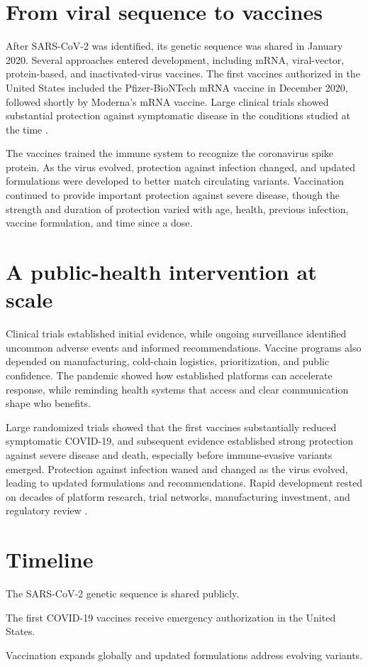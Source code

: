 \documentclass[12pt,oneside]{book}
\begin{document}
\section{From viral sequence to vaccines}
After SARS-CoV-2 was identified, its genetic sequence was shared in January
2020. Several approaches entered development, including mRNA, viral-vector,
protein-based, and inactivated-virus vaccines. The first vaccines authorized
in the United States included the Pfizer-BioNTech mRNA vaccine in December
2020, followed shortly by Moderna's mRNA vaccine. Large clinical trials
showed substantial protection against symptomatic disease in the conditions
studied at the time \cite{cdcCovidVaccineTimeline,cdcModernaTrial}.

The vaccines trained the immune system to recognize the coronavirus spike
protein. As the virus evolved, protection against infection changed, and
updated formulations were developed to better match circulating variants.
Vaccination continued to provide important protection against severe disease,
though the strength and duration of protection varied with age, health,
previous infection, vaccine formulation, and time since a dose.

\section{A public-health intervention at scale}
Clinical trials established initial evidence, while ongoing surveillance
identified uncommon adverse events and informed recommendations. Vaccine
programs also depended on manufacturing, cold-chain logistics, prioritization,
and public confidence. The pandemic showed how established platforms can
accelerate response, while reminding health systems that access and clear
communication shape who benefits.

Large randomized trials showed that the first vaccines substantially reduced
symptomatic COVID-19, and subsequent evidence established strong protection
against severe disease and death, especially before immune-evasive variants
emerged. Protection against infection waned and changed as the virus evolved,
leading to updated formulations and recommendations. Rapid development rested
on decades of platform research, trial networks, manufacturing investment, and
regulatory review \cite{cdcModernaTrial,cdcCovidVaccineTimeline}.

\section*{Timeline}
\begin{description}[leftmargin=2.3cm,style=nextline]
  \item[January 2020] The SARS-CoV-2 genetic sequence is shared publicly.
  \item[December 2020] The first COVID-19 vaccines receive emergency authorization in the United States.
  \item[2021 onward] Vaccination expands globally and updated formulations address evolving variants.
\end{description}
\end{document}

